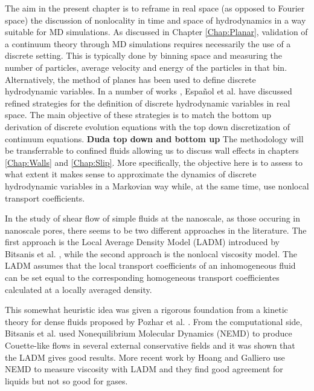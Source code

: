 \documentclass[b5paper,openright,10pt]{book}
\newcommand{\Note}[1]{{\bf \color{red}#1}}    %
\begin{document}
The aim in the present chapter is to reframe in  real space (as opposed
to Fourier space) the discussion of  nonlocality in time and space of
hydrodynamics in  a way suitable  for MD simulations. As  discussed in
Chapter \ref{Chap:Planar},  validation of  a continuum  theory
through  MD simulations  requires necessarily  the use  of a  discrete
setting.  This  is typically done  by binning space and  measuring the
number of particles,  average velocity and energy of  the particles in
that     bin.      Alternatively,     the     method     of     planes
\cite{Davis1996,Travis2000}   has  been   used   to  define   discrete
hydrodynamic     variables.      In      a     number     of     works
\cite{Espanol2009i,DelaTorre2011,DelaTorre2015,EspanolDonev2015},   Español et al.
have  discussed  refined strategies  for  the  definition of  discrete
hydrodynamic variables  in real  space.  The  main objective  of these
strategies is to match the  bottom up derivation of discrete evolution
equations with the top down  discretization of continuum equations. \Note{Duda top down and bottom up}
The  methodology will be  transferrable to
confined fluids allowing  us to discuss wall  effects in chapters \ref{Chap:Walls} and \ref{Chap:Slip}.  More  specifically, the
objective  here  is  to  assess  to what  extent  it  makes  sense  to
approximate  the  dynamics of  discrete  hydrodynamic  variables in  a
Markovian  way  while,  at  the same  time,  use  nonlocal  transport
coefficients. 

In the study of shear flow of simple fluids at the nanoscale, as those
occuring  in  nanoscale  pores,  there   seems  to  be  two  different
approaches in the literature.  The first approach is the Local Average
Density Model  (LADM) introduced by Bitsanis  et al.  \cite{Bitsanis1987},
while the second  approach is the nonlocal viscosity  model. 
The LADM assumes that the local transport coefficients of an inhomogeneous
fluid can be set equal to the corresponding homogeneous transport coefficientes calculated at a locally averaged density. 

This somewhat  heuristic idea
was given a rigorous foundation from a kinetic theory for dense fluids
proposed by Pozhar et al.  \cite{Pozhar1991a}.  From the computational
side,   Bitsanis  et   al.  \cite{Bitsanis1987}   used  Nonequilibrium
Molecular  Dynamics (NEMD)  to produce  Couette-like flows  in several
external conservative fields and it was shown that the LADM gives good
results.    More     recent    work    by    Hoang     and    Galliero
\cite{Hoang2012a,Hoang2012b} use  NEMD to  measure viscosity
with LADM and they find good agreement for liquids but not so good for
gases.
\end{document}

